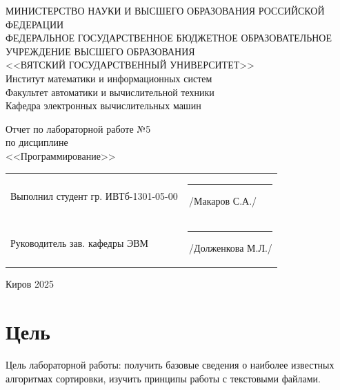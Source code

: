 \documentclass[a4paper,14pt]{extarticle}
\begin{document}
  \newpage\thispagestyle{empty}
  \begin{center}
    \MakeUppercase{
      Министерство науки и высшего образования Российской Федерации\\
      Федеральное государственное бюджетное образовательное учреждение высшего образования\\
      <<Вятский Государственный Университет>>\\
    }
    Институт математики и информационных систем\\
    Факультет автоматики и вычислительной техники\\
    Кафедра электронных вычислительных машин
  \end{center}
  \vfill

  \begin{center}
    Отчет по лабораторной работе №5\\
    по дисциплине\\
    <<Программирование>>\\
  \end{center}
  \vfill

  \noindent
  \begin{tabular}{ll}
    Выполнил студент гр. ИВТб-1301-05-00 \hspace{5mm} &
    \rule[-1mm]{25mm}{0.10mm}\,/Макаров С.А./\\
    
    Руководитель зав. кафедры ЭВМ & \rule[-1mm]{25mm}{0.10mm}\,/Долженкова М.Л./\\
  \end{tabular}

  \vfill
  \begin{center}
    Киров 2025
  \end{center}

  \newpage
  \section*{Цель}
  Цель лабораторной работы: получить базовые сведения о наиболее известных алгоритмах сортировки, изучить принципы работы с текстовыми файлами.
\end{document}
